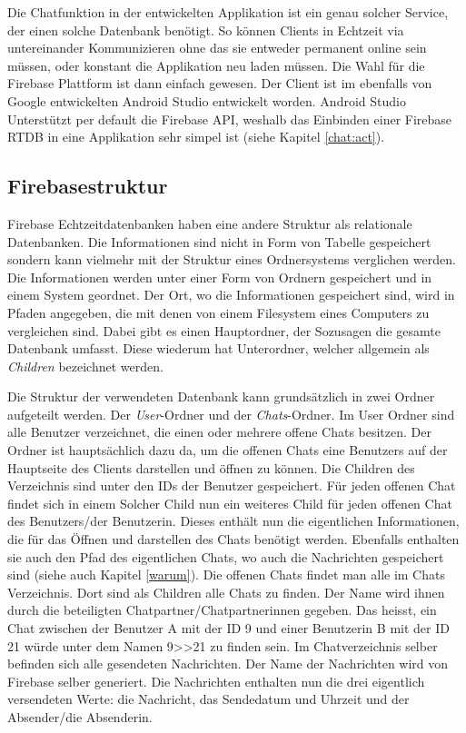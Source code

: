 \documentclass[a4paper,11pt]{report}
\begin{document}
				Die Chatfunktion in der entwickelten Applikation ist ein genau solcher Service, der einen solche Datenbank benötigt. So können Clients in Echtzeit via untereinander Kommunizieren ohne das sie entweder permanent online sein müssen, oder konstant die Applikation neu laden müssen. Die Wahl für die Firebase Plattform ist dann einfach gewesen. Der Client ist im ebenfalls von Google entwickelten Android Studio entwickelt worden. Android Studio Unterstützt per default die Firebase API, weshalb das Einbinden einer Firebase RTDB in eine Applikation sehr simpel ist (siehe Kapitel \ref{chat:act}).
				\subsection{Firebasestruktur}
				Firebase Echtzeitdatenbanken haben eine andere Struktur als relationale Datenbanken. Die Informationen sind nicht in Form von Tabelle gespeichert sondern kann vielmehr mit der Struktur eines Ordnersystems verglichen werden. Die Informationen werden unter einer Form von Ordnern gespeichert und in einem System geordnet. Der Ort, wo die Informationen gespeichert sind, wird in Pfaden angegeben, die mit denen von einem Filesystem eines Computers zu vergleichen sind. Dabei gibt es einen Hauptordner, der Sozusagen die gesamte Datenbank umfasst. Diese wiederum hat Unterordner, welcher allgemein als \emph{Children} bezeichnet werden.
				
				Die Struktur der verwendeten Datenbank kann grundsätzlich in zwei Ordner aufgeteilt werden. Der \emph{User}-Ordner und der \emph{Chats}-Ordner. Im User Ordner	sind alle Benutzer verzeichnet, die einen oder mehrere offene Chats besitzen. Der Ordner ist hauptsächlich dazu da, um die offenen Chats eine Benutzers auf der Hauptseite des Clients darstellen und öffnen zu können. Die Children des Verzeichnis sind unter den IDs der Benutzer gespeichert. Für jeden offenen Chat findet sich in einem Solcher Child nun ein weiteres Child für jeden offenen Chat des Benutzers/der Benutzerin. Dieses enthält nun die eigentlichen Informationen, die für das Öffnen und darstellen des Chats benötigt werden. Ebenfalls enthalten sie auch den Pfad des eigentlichen Chats, wo auch die Nachrichten gespeichert sind (siehe auch Kapitel \ref{warum}). Die offenen Chats findet man alle im Chats Verzeichnis. Dort sind als Children alle Chats zu finden. Der Name wird ihnen durch die beteiligten Chatpartner/Chatpartnerinnen gegeben. Das heisst, ein Chat zwischen der Benutzer A mit der ID 9 und einer Benutzerin B mit der ID 21 würde unter dem Namen 9>>21 zu finden sein. Im Chatverzeichnis selber befinden sich alle gesendeten Nachrichten. Der Name der Nachrichten wird von Firebase selber generiert. Die Nachrichten enthalten nun die drei eigentlich versendeten Werte: die Nachricht, das Sendedatum und Uhrzeit und der Absender/die Absenderin.
				
\end{document}
